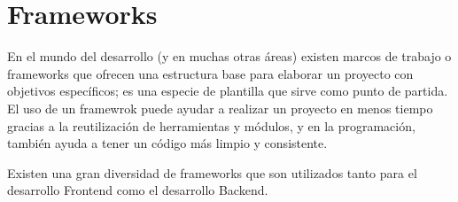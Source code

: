 \section{Frameworks}
En el mundo del desarrollo (y en muchas otras áreas) existen marcos de trabajo o frameworks que ofrecen una estructura base para elaborar un proyecto con objetivos específicos; es una especie de plantilla que sirve como punto de partida. El uso de un framewrok puede ayudar a realizar un proyecto en menos tiempo gracias a la reutilización de herramientas y módulos, y en la programación, también ayuda a tener un código más limpio y consistente.

Existen una gran diversidad de frameworks que son utilizados tanto para el desarrollo Frontend como el desarrollo Backend. 
    
    
